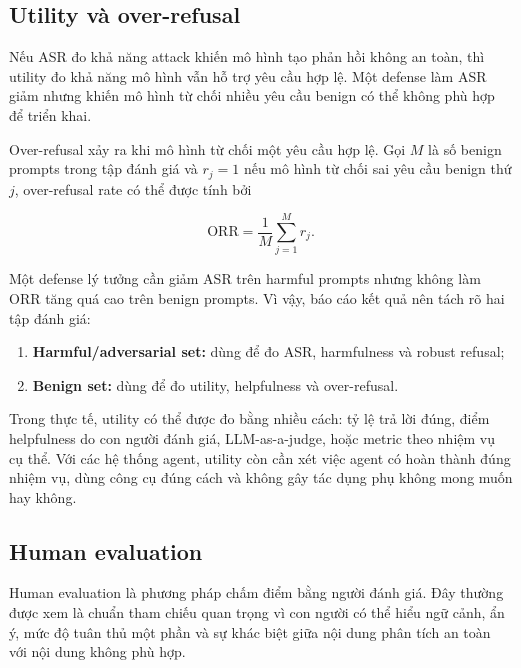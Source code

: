 \subsection{Utility và over-refusal}
\label{subsec:utility-over-refusal}

Nếu ASR đo khả năng attack khiến mô hình tạo phản hồi không an toàn, thì
utility đo khả năng mô hình vẫn hỗ trợ yêu cầu hợp lệ. Một defense làm ASR
giảm nhưng khiến mô hình từ chối nhiều yêu cầu benign có thể không phù hợp
để triển khai.

Over-refusal xảy ra khi mô hình từ chối một yêu cầu hợp lệ. Gọi $M$ là số
benign prompts trong tập đánh giá và $r_j = 1$ nếu mô hình từ chối sai yêu
cầu benign thứ $j$, over-refusal rate có thể được tính bởi

\begin{equation}
    \mathrm{ORR}
    =
    \frac{1}{M}
    \sum_{j=1}^{M}
    r_j.
    \label{eq:over-refusal-rate}
\end{equation}

Một defense lý tưởng cần giảm ASR trên harmful prompts nhưng không làm ORR
tăng quá cao trên benign prompts. Vì vậy, báo cáo kết quả nên tách rõ hai
tập đánh giá:

\begin{enumerate}[leftmargin=1.2cm]
    \item \textbf{Harmful/adversarial set:}
    dùng để đo ASR, harmfulness và robust refusal;

    \item \textbf{Benign set:}
    dùng để đo utility, helpfulness và over-refusal.
\end{enumerate}

Trong thực tế, utility có thể được đo bằng nhiều cách: tỷ lệ trả lời đúng,
điểm helpfulness do con người đánh giá, LLM-as-a-judge, hoặc metric theo
nhiệm vụ cụ thể. Với các hệ thống agent, utility còn cần xét việc agent có
hoàn thành đúng nhiệm vụ, dùng công cụ đúng cách và không gây tác dụng phụ
không mong muốn hay không.

\subsection{Human evaluation}
\label{subsec:human-evaluation}

Human evaluation là phương pháp chấm điểm bằng người đánh giá. Đây thường
được xem là chuẩn tham chiếu quan trọng vì con người có thể hiểu ngữ cảnh,
ẩn ý, mức độ tuân thủ một phần và sự khác biệt giữa nội dung phân tích an
toàn với nội dung không phù hợp.

